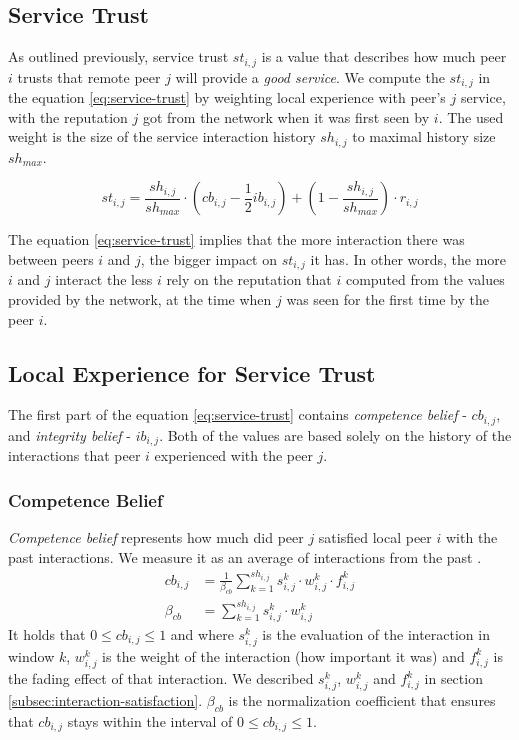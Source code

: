 \subsection{Service Trust}
\label{subsec:service-trust}
As outlined previously, service trust $st_{i, j}$ is a value that describes how much peer $i$ trusts that remote peer $j$ will provide a \textit{good service}.
We compute the $st_{i, j}$ in the equation \ref{eq:service-trust} by weighting local experience with peer's $j$ service, with the reputation $j$ got from the network when it was first seen by $i$.
The used weight is the size of the service interaction history $sh_{i,j}$ to maximal history size $sh_{max}$.

\begin{equation}
\label{eq:service-trust}
    st_{i,j}=\frac{sh_{i,j}}{sh_{max}} \cdot \left(cb_{i,j} - \frac{1}{2} ib_{i,j} \right) +\left(1-\frac{sh_{i,j}}{sh_{max}}\right) \cdot r_{i,j}
\end{equation}

The equation \ref{eq:service-trust} implies that the more interaction there was between peers $i$ and $j$, the bigger impact on $st_{i,j}$ it has. 
In other words, the more $i$ and $j$ interact the less $i$ rely on the reputation that $i$ computed from the values provided by the network, at the time when $j$ was seen for the first time by the peer $i$.

\subsection{Local Experience for Service Trust}
The first part of the equation \ref{eq:service-trust} contains \textit{competence belief} - $cb_{i,j}$, and \textit{integrity belief} - $ib_{i,j}$.
Both of the values are based solely on the history of the interactions that peer $i$ experienced with the peer $j$.

\subsubsection{Competence Belief}
\textit{Competence belief} represents how much did peer $j$ satisfied local peer $i$ with the past interactions. We measure it as an average of interactions from the past \cite{sort}.
\begin{equation}
\begin{split}
    cb_{i,j} &= \frac{1}{\beta_{cb}} \sum_{k=1}^{sh_{i, j}} s_{i,j}^{k} \cdot w_{i,j}^{k} \cdot f_{i,j}^{k} \\
    \beta_{cb} &= \sum_{k=1}^{sh_{i, j}} s_{i,j}^{k} \cdot w_{i,j}^{k}
\end{split}
\end{equation}
It holds that $0 \leq cb_{i,j} \leq 1$ and where $s^{k}_{i,j}$ is the evaluation of the interaction in window $k$, $w^{k}_{i, j}$ is the weight of the interaction (how important it was) and $f^{k}_{i,j}$ is the fading effect of that interaction. We described $s^{k}_{i,j}$, $w^{k}_{i,j}$ and $f^{k}_{i,j}$ in section \ref{subsec:interaction-satisfaction}. 
$\beta_{cb}$ is the normalization coefficient that ensures that $cb_{i, j}$ stays within the interval of $0 \leq cb_{i,j} \leq 1$.


